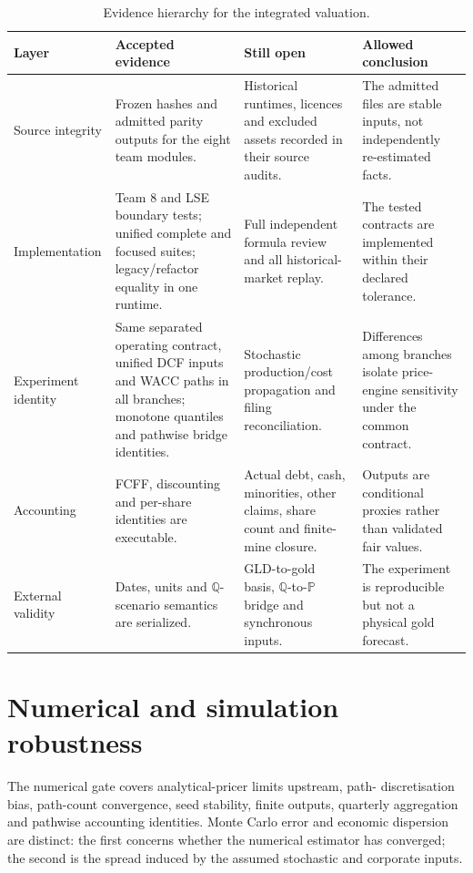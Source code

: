 \begin{table}[H]
\centering
\caption{Evidence hierarchy for the integrated valuation.}
\label{tab:validation-evidence-hierarchy}
\scriptsize
\setlength{\tabcolsep}{3pt}
\renewcommand{\arraystretch}{1.10}
\begin{tabularx}{\textwidth}{@{}p{2.20cm}X X X@{}}
\toprule
Layer & Accepted evidence & Still open & Allowed conclusion \\
\midrule
Source integrity & Frozen hashes and admitted parity outputs for the eight
team modules. & Historical runtimes, licences and excluded assets recorded in
their source audits. & The admitted files are stable inputs, not independently
re-estimated facts. \\
Implementation & Team 8 and LSE boundary tests; unified complete and focused
suites; legacy/refactor equality in one runtime. & Full independent formula
review and all historical-market replay. & The tested contracts are
implemented within their declared tolerance. \\
Experiment identity & Same separated operating contract, unified DCF inputs and WACC paths in
all branches; monotone quantiles and pathwise bridge identities. & Stochastic
production/cost propagation and filing reconciliation. & Differences among
branches isolate price-engine sensitivity under the common contract. \\
Accounting & FCFF, discounting and per-share identities are executable. &
Actual debt, cash, minorities, other claims, share count and finite-mine
closure. & Outputs are conditional proxies rather than validated fair values. \\
External validity & Dates, units and \(\mathbb Q\)-scenario semantics are
serialized. & GLD-to-gold basis, \(\mathbb Q\)-to-\(\mathbb P\) bridge and
synchronous inputs. & The experiment is reproducible but not a physical gold
forecast. \\
\bottomrule
\end{tabularx}
\end{table}

\section{Numerical and simulation robustness}

The numerical gate covers analytical-pricer limits upstream, path-
discretisation bias, path-count convergence, seed stability, finite outputs,
quarterly aggregation and pathwise accounting identities. Monte Carlo error
and economic dispersion are distinct: the first concerns whether the numerical
estimator has converged; the second is the spread induced by the assumed
stochastic and corporate inputs.

